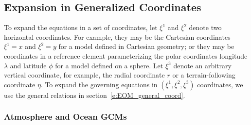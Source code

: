 \documentclass{report}
\begin{document}
\subsection{Expansion in Generalized Coordinates}

To expand the equations in a set of coordinates, let $\xi^1$ and $\xi^2$ denote two horizontal coordinates. For example, they may be the Cartesian coordinates $\xi^1 = x$ and $\xi^2 =y$ for a model defined in Cartesian geometry; or they may be coordinates in a reference element parameterizing the polar coordinates longitude $\lambda$ and latitude $\phi$ for a model defined on a sphere. Let $\xi^3$ denote an arbitrary vertical coordinate, for example, the radial coordinate $r$ or a terrain-following coordinate $\eta$. To expand the governing equations in $(\xi^1, \xi^2, \xi^3)$ coordinates, we use the general relations in section~\ref{e:EOM_general_coord}. 

\subsubsection{Atmosphere and Ocean GCMs}
\end{document}
